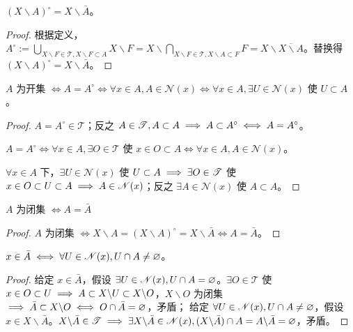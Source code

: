 \begin{theorem}
    $(X\backslash A)^\circ=X\backslash \bar A$。
\end{theorem}
\begin{proof}
    根据定义，$A^\circ:=\bigcup_{X\backslash F\in\mathscr T,X\backslash F\subset A} X\backslash F=X\backslash\bigcap_{X\backslash F\in\mathscr T,X\backslash A\subset F} F=X\backslash\overline{X\backslash A}$。替换得 $(X\backslash A)^\circ=X\backslash \bar A$。
\end{proof}

\begin{theorem}
    $A$ 为开集 $\iff A=A^\circ\iff\forall x\in A,A\in\mathscr N(x)\iff\forall x\in A,\exists U\in\mathscr N(x)$ 使 $U\subset A$。
\end{theorem}

\begin{proof}
    $A=A^\circ\in\mathscr T$；反之 $A\in\mathscr T,A\subset A\implies A\subset A^\circ\iff A=A^\circ$。

    $A=A^\circ\iff\forall x\in A,\exists O\in\mathscr T$ 使 $x\in O\subset A\iff\forall x\in A, A\in\mathscr N(x)$。
    
    $\forall x\in A$ 下，$\exists U\in\mathscr N(x)$ 使 $U\subset A\implies \exists O\in\mathscr T$ 使 $ x\in O\subset U\subset A \implies A\in\mathscr N(x)$；反之 $\exists A\in\mathscr N(x)$ 使 $A\subset A$。
\end{proof}

\begin{theorem}
    $A$ 为闭集 $\iff A=\bar A$
\end{theorem}
\begin{proof}
    $A$ 为闭集 $\iff X\backslash A=(X\backslash A)^\circ=X\backslash\bar A\iff A=\bar A$。
\end{proof}

\begin{theorem}
    $x\in\bar A\iff \forall U\in\mathscr N(x),U\cap A\ne\varnothing$。
\end{theorem}
\begin{proof}
    给定 $x\in\bar A$，假设 $\exists U \in\mathscr N(x),U \cap A=\varnothing$。$\exists O\in\mathscr T$ 使 $x\in O\subset U\implies A\subset X \backslash U\subset X \backslash O$，$X \backslash O$ 为闭集 $\implies \bar{A} \subset X \backslash O\iff O \cap \bar{A}=\varnothing$，矛盾； 
    给定 $\forall U\in\mathscr N(x),U\cap A\ne\varnothing$，假设 $x\in X \backslash \bar{A}$。$X \backslash \bar{A}\in\mathscr T\implies \exists X \backslash \bar{A}\in\mathscr N(x),(X \backslash \bar{A}) \cap A=A \backslash \bar{A}=\varnothing$，矛盾。
\end{proof}


